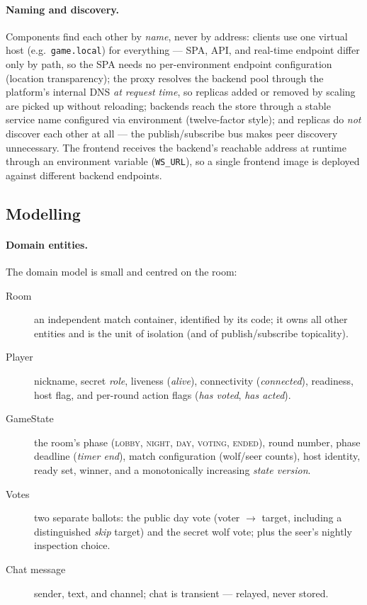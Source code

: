 \documentclass{scrartcl}
\begin{document}
\paragraph{Naming and discovery.}
Components find each other by \emph{name}, never by address: clients use one
virtual host (e.g.\ \texttt{game.local}) for everything --- SPA, API, and
real-time endpoint differ only by path, so the SPA needs no per-environment
endpoint configuration (location transparency); the proxy resolves the backend
pool through the platform's internal DNS \emph{at request time}, so replicas
added or removed by scaling are picked up without reloading; backends reach the
store through a stable service name configured via environment (twelve-factor
style); and replicas do \emph{not} discover each other at all --- the
publish/subscribe bus makes peer discovery unnecessary. The frontend receives the
backend's reachable address at runtime through an environment variable
(\texttt{WS\_URL}), so a single frontend image is deployed against different
backend endpoints.

\subsection{Modelling}\label{modelling}

\paragraph{Domain entities.}
The domain model is small and centred on the room:
\begin{description}
      \item[Room] an independent match container, identified by its code; it owns all
            other entities and is the unit of isolation (and of publish/subscribe
            topicality).
      \item[Player] nickname, secret \emph{role}, liveness (\emph{alive}),
            connectivity (\emph{connected}), readiness, host flag, and per-round action
            flags (\emph{has voted}, \emph{has acted}).
      \item[GameState] the room's phase (\textsc{lobby}, \textsc{night},
            \textsc{day}, \textsc{voting}, \textsc{ended}), round number, phase deadline
            (\emph{timer end}), match configuration (wolf/seer counts), host identity,
            ready set, winner, and a monotonically increasing \emph{state version}.
      \item[Votes] two separate ballots: the public day vote (voter $\rightarrow$
            target, including a distinguished \emph{skip} target) and the secret wolf vote;
            plus the seer's nightly inspection choice.
      \item[Chat message] sender, text, and channel; chat is transient --- relayed,
            never stored.
\end{description}
\end{document}
